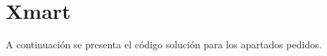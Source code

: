\section{Xmart}

  A continuación se presenta el código solución
  para los apartados pedidos.
  
  